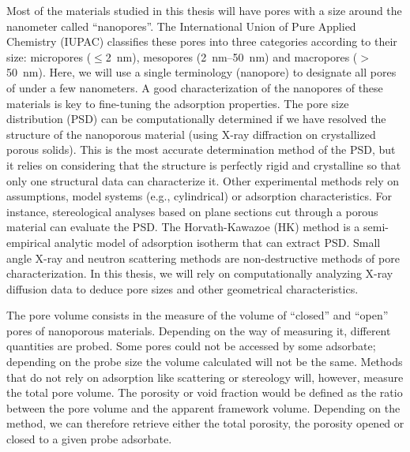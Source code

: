 \documentclass[main.tex]{subfiles}
\begin{document}
Most of the materials studied in this thesis will have pores with a size around the nanometer called ``nanopores''. The International Union of Pure Applied Chemistry (IUPAC) classifies these pores into three categories according to their size: micropores ($\leq$\SI{2}{\nano\meter}), mesopores (\SI{2}{\nano\meter}--\SI{50}{\nano\meter}) and macropores ($>$\SI{50}{\nano\meter}).\autocite{Sing_1985} Here,
we will use a single terminology (nanopore) to designate all pores of under a few nanometers. A good characterization of the nanopores of these materials is key to fine-tuning the adsorption properties.\autocite{Yan_2020} The pore size distribution (PSD) can be computationally determined if we have resolved the structure of the nanoporous material (using X-ray diffraction on crystallized porous solids). This is the most accurate determination method of the PSD, but it relies on considering that the structure is perfectly rigid and crystalline so that only one structural data can characterize it. Other experimental methods rely on assumptions, model systems (e.g., cylindrical) or adsorption characteristics. For instance, stereological analyses based on plane sections cut through a porous material can evaluate the PSD.\autocite{Haynes_1973} The Horvath-Kawazoe (HK) method is a semi-empirical analytic model of adsorption isotherm that can extract PSD. Small angle X-ray and neutron scattering methods are non-destructive methods of pore characterization.\autocite{Radlinski_2004} In this thesis, we will rely on computationally analyzing X-ray diffusion data to deduce pore sizes and other geometrical characteristics. 

The pore volume consists in the measure of the volume of ``closed'' and ``open'' pores of nanoporous materials. Depending on the way of measuring it, different quantities are probed. Some pores could not be accessed by some adsorbate; depending on the probe size the volume calculated will not be the same. Methods that do not rely on adsorption like scattering or stereology will, however, measure the total pore volume. The porosity or void fraction would be defined as the ratio between the pore volume and the apparent framework volume. Depending on the method, we can therefore retrieve either the total porosity, the porosity opened or closed to a given probe adsorbate. 
\end{document}
